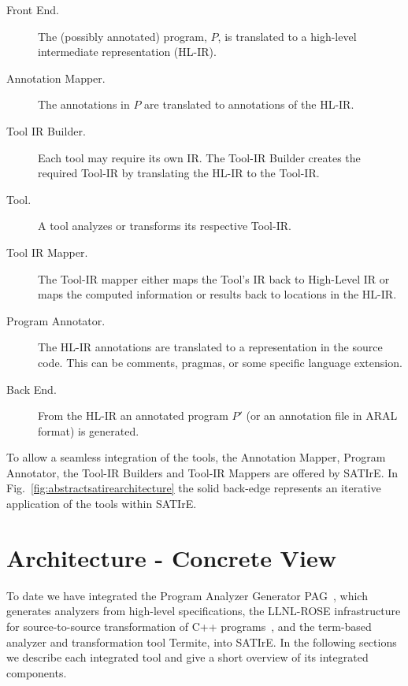\documentclass[a4paper,12pt]{report}
\newcommand{\satire}[0]{SATIrE}
\begin{document}
\begin{description}
\item [Front End.] The (possibly annotated) program, $P$, is translated to a high-level intermediate representation (HL-IR).
\item [Annotation Mapper.] The annotations in $P$ are translated to annotations of the HL-IR.
\item [Tool IR Builder.] Each tool may require its own IR. The Tool-IR Builder creates the required Tool-IR by translating the HL-IR to the Tool-IR.
\item [Tool.] A tool analyzes or transforms its respective Tool-IR.
\item [Tool IR Mapper.] The Tool-IR mapper either maps the Tool's IR
back to High-Level IR or maps the computed information or results back
to locations in the HL-IR.
\item [Program Annotator.] The HL-IR annotations are translated to a representation in the source code. This can be comments, pragmas, or some specific language extension.
\item [Back End.] From the HL-IR an annotated program $P'$ (or an annotation file in ARAL format) is generated.
\end{description}

To allow a seamless integration of the tools, the Annotation Mapper,
Program Annotator, the Tool-IR Builders and Tool-IR Mappers are
offered by SATIrE. In Fig.~\ref{fig:abstractsatirearchitecture} the
solid back-edge represents an iterative application of the tools
within SATIrE.

\section{Architecture - Concrete View}
\label{sec:concretearchitecture}

To date we have integrated the Program Analyzer
Generator PAG~\cite{martin98}, which generates analyzers from
high-level specifications, the LLNL-ROSE infrastructure for
source-to-source transformation of C++ programs~\cite{MS-SCAM05}, and
the term-based analyzer and transformation tool Termite, into \satire.
In the following sections we describe each integrated tool and give a
short overview of its integrated components.
\end{document}
